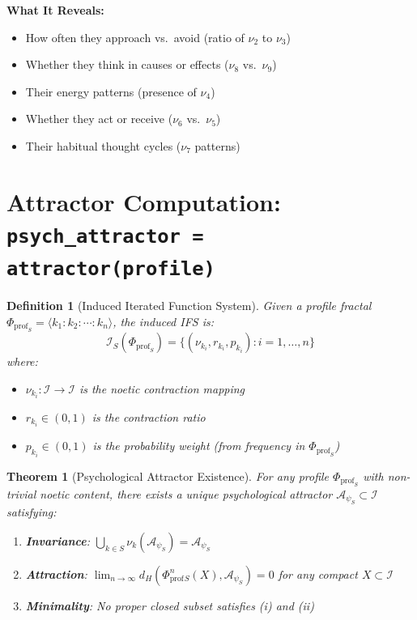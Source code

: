 \documentclass[11pt,twoside]{book}
\newcommand{\noe}[1]{\nu_{#1}}
\newcommand{\Ideas}{\mathcal{I}}
\newcommand{\PsychAttractor}{\mathcal{A}_\psi}
\newcommand{\ProfileFrac}{\Phi_{\mathrm{prof}}}
\newcommand{\IFS}{\mathcal{I}_S}
\newtheorem{definition}{Definition}[chapter]
\newtheorem{theorem}{Theorem}[chapter]
\begin{document}
\begin{tcolorbox}[colback=green!5!white,colframe=green!65!black,title=\textbf{Plain English: The ``Mind-Reading Machine''},breakable]
\textbf{What It Reveals:}
\begin{itemize}
    \item How often they approach vs.\ avoid (ratio of $\noe{2}$ to $\noe{3}$)
    \item Whether they think in causes or effects ($\noe{8}$ vs.\ $\noe{9}$)
    \item Their energy patterns (presence of $\noe{4}$)
    \item Whether they act or receive ($\noe{6}$ vs.\ $\noe{5}$)
    \item Their habitual thought cycles ($\noe{7}$ patterns)
\end{itemize}

\end{tcolorbox}

\section{Attractor Computation: \texttt{psych\_attractor = attractor(profile)}}

\begin{definition}[Induced Iterated Function System]
\label{def:induced-ifs}
Given a profile fractal $\ProfileFrac_S = \langle k_1 : k_2 : \cdots : k_n \rangle$,
the \emph{induced IFS} is:
\[
    \IFS(\ProfileFrac_S) = \{(\noe{k_i}, r_{k_i}, p_{k_i}) : i = 1, \ldots, n\}
\]
where:
\begin{itemize}
    \item $\noe{k_i} : \Ideas \to \Ideas$ is the noetic contraction mapping
    \item $r_{k_i} \in (0, 1)$ is the contraction ratio
    \item $p_{k_i} \in (0, 1)$ is the probability weight (from frequency in $\ProfileFrac_S$)
\end{itemize}
\end{definition}

\begin{theorem}[Psychological Attractor Existence]
\label{thm:psych-attractor-existence}
For any profile $\ProfileFrac_S$ with non-trivial noetic content, there exists a unique
psychological attractor $\PsychAttractor_S \subset \Ideas$ satisfying:

\begin{enumerate}[label=(\roman*)]
    \item \textbf{Invariance}: $\bigcup_{k \in S} \noe{k}(\PsychAttractor_S) = \PsychAttractor_S$
    \item \textbf{Attraction}: $\lim_{n \to \infty} d_H(\ProfileFrac^n_S(X), \PsychAttractor_S) = 0$
          for any compact $X \subset \Ideas$
    \item \textbf{Minimality}: No proper closed subset satisfies (i) and (ii)
\end{enumerate}
\end{theorem}
\end{document}
